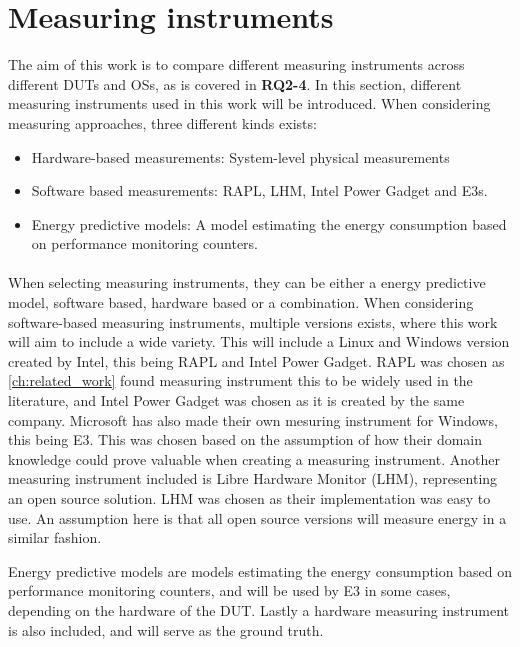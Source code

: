 \section{Measuring instruments}\label{sec:measuring_instruments}

The aim of this work is to compare different measuring instruments across different DUTs and OSs, as is covered in \textbf{RQ2-4}. In this section, different measuring instruments used in this work will be introduced. When considering measuring approaches, three different kinds exists:

\begin{itemize}
    \item Hardware-based measurements: System-level physical measurements
    \item Software based measurements: RAPL, LHM, Intel Power Gadget and E3s.
    \item Energy predictive models: A model estimating the energy consumption based on performance monitoring counters.
\end{itemize}

\paragraph*{}
When selecting measuring instruments, they can be either a energy predictive model, software based, hardware based or a combination. When considering software-based measuring instruments, multiple versions exists, where this work will aim to include a wide variety. This will include a Linux and Windows version created by Intel, this being RAPL and Intel Power Gadget. RAPL was chosen as \cref{ch:related_work} found measuring instrument this to be widely used in the literature, and Intel Power Gadget was chosen as it is created by the same company. Microsoft has also made their own mesuring instrument for Windows, this being E3. This was chosen based on the assumption of how their domain knowledge could prove valuable when creating a measuring instrument. Another measuring instrument included is Libre Hardware Monitor (LHM), representing an open source solution. LHM was chosen as their implementation was easy to use. An assumption here is that all open source versions will measure energy in a similar fashion.\newline

Energy predictive models are models estimating the energy consumption based on performance monitoring counters, and will be used by E3 in some cases, depending on the hardware of the DUT. Lastly a hardware measuring instrument is also included, and will serve as the ground truth.



